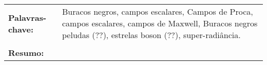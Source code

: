\begin{tabularx}{\textwidth}{lX}	
%
{\bf Palavras-chave:} & Buracos negros, campos escalares, Campos de Proca, campos escalares, campos de Maxwell, Buracos negros peludas (??), estrelas boson (??), super-radi\^ancia.\\
\\
%
{\bf Resumo:} 
%
\end{tabularx}


